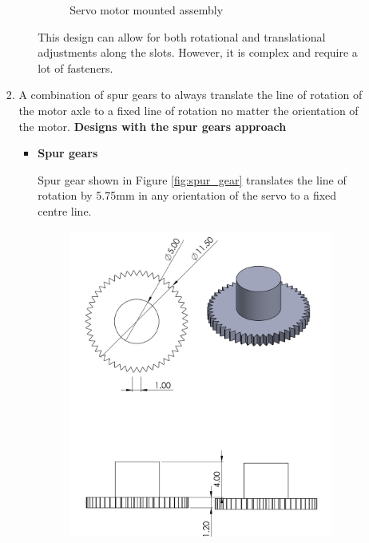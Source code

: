\begin{enumerate}
\begin{enumerate}
\begin{enumerate}
\begin{itemize}
\begin{figure}[H]
                \caption{Servo motor mounted assembly}
                \label{fig:servo_motor_mounted_assembly}
            \end{figure}
             This design can allow for both rotational and translational adjustments along the slots. However, it is complex and require a lot of fasteners.
         \end{itemize}
         \item A combination of spur gears to always translate the line of rotation of the motor axle to a fixed line of rotation no matter the orientation of the motor.
         \clearpage
         \textbf{Designs with the spur gears approach}
         \par
          \begin{itemize}
              \item \textbf{Spur gears}
              \par
              Spur gear shown in Figure \ref{fig:spur_gear} translates the line of rotation by 5.75mm in any orientation of the servo to a fixed centre line.
              \begin{figure}[H]
                  \centering
                  \includegraphics[height=.55\textheight]{Figures/SpurGear1.PNG}

\end{figure}
\end{itemize}
\end{enumerate}
\end{enumerate}
\end{enumerate}
